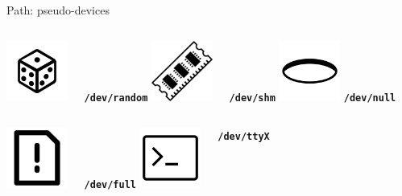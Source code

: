 \documentclass{beamer}
\begin{document}
    \begin{frame}{Path: pseudo-devices}
        \begin{columns}[t, onlytextwidth]
                \centering
                \includegraphics[height=2cm, keepaspectratio]{images/dice.pdf}
                
                \texttt{\textbf{/dev/random}}
                \centering
                \includegraphics[height=2cm, keepaspectratio]{images/ram.pdf}
                
                \texttt{\textbf{/dev/shm}}
                \centering
                \includegraphics[height=2cm, keepaspectratio]{images/hole.pdf}
                \texttt{\textbf{/dev/null}}
        \end{columns}

        \vspace{2cm}

        \begin{columns}[t, onlytextwidth]
                \centering
                \includegraphics[height=2cm, keepaspectratio]{images/alert-file.pdf}
                
                \texttt{\textbf{/dev/full}}
                \centering
                \includegraphics[height=2cm, keepaspectratio]{images/terminal.pdf}

                \texttt{\textbf{/dev/ttyX}}
        \end{columns}
        
    \end{frame}
\end{document}
